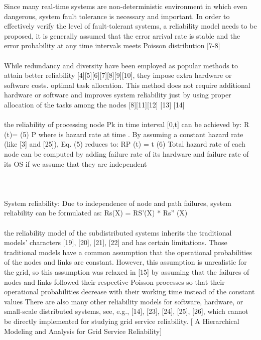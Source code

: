 \documentclass{cslthse-msc}
\begin{document}
Since many real-time systems are non-deterministic environment in which even dangerous, system fault tolerance is necessary and important. In order to effectively verify the level of fault-tolerant systems, a reliability model needs to be proposed, it is generally assumed that the error arrival rate is stable and the error probability at any time intervals meets Poisson distribution [7-8] \cite{realTimeSchedAlgo}
\\\\
While redundancy and diversity have been employed as popular methods to attain better reliability [4][5][6][7][8][9][10], they impose extra hardware or software costs.
optimal task allocation. This method does not require additional hardware or software and improves system reliability just by using proper allocation of the tasks among the nodes [8][11][12] [13] [14] \cite{optTaskAllocationForMaxRel}
\\\\
the reliability of processing node Pk in
time interval [0,t] can be achieved by:
R (t)=            (5) P 
where       is hazard rate at time  . By assuming a constant hazard rate (like [3] and [25]), Eq. (5) reduces to:
RP (t) =       t (6) Total hazard rate of each node can be computed by adding failure rate of its hardware and failure rate of its OS if we assume that they are independent 
\\\\
\cite{discContRelModel}
\\\\
System reliability: Due to independence of node and path failures, system reliability can be formulated as: Rs(X) = RS’(X) * Rs” (X) \cite{optTaskAllocationForMaxRel}
\\\\
the reliability model of the subdistributed systems inherits the traditional models’ characters [19], [20], [21], [22] and has certain limitations. Those traditional models have a common assumption that the operational probabilities of the nodes and links are constant. However, this assumption is unrealistic for the grid, so this assumption was relaxed in [15] by assuming that the failures of nodes and links followed their respective Poisson processes so that their operational probabilities decrease with their working time instead of the constant values 
There are also many other reliability models for software, hardware, or small-scale distributed systems, see, e.g., [14], [23], [24], [25], [26], which cannot be directly implemented for studying grid service reliability. [ A Hierarchical Modeling and Analysis for Grid Service Reliability]
\end{document}
